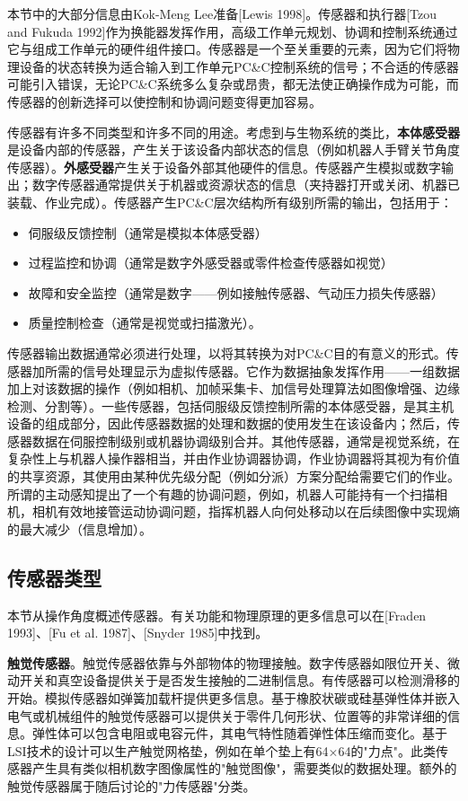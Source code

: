 \documentclass[UTF8,a4paper]{ctexart}
\begin{document}
本节中的大部分信息由Kok-Meng Lee准备[Lewis 1998]。传感器和执行器[Tzou and Fukuda 1992]作为换能器发挥作用，高级工作单元规划、协调和控制系统通过它与组成工作单元的硬件组件接口。传感器是一个至关重要的元素，因为它们将物理设备的状态转换为适合输入到工作单元PC\&C控制系统的信号；不合适的传感器可能引入错误，无论PC\&C系统多么复杂或昂贵，都无法使正确操作成为可能，而传感器的创新选择可以使控制和协调问题变得更加容易。

传感器有许多不同类型和许多不同的用途。考虑到与生物系统的类比，\textbf{本体感受器}是设备内部的传感器，产生关于该设备内部状态的信息（例如机器人手臂关节角度传感器）。\textbf{外感受器}产生关于设备外部其他硬件的信息。传感器产生模拟或数字输出；数字传感器通常提供关于机器或资源状态的信息（夹持器打开或关闭、机器已装载、作业完成）。传感器产生PC\&C层次结构所有级别所需的输出，包括用于：
\begin{itemize}
    \item 伺服级反馈控制（通常是模拟本体感受器）
    \item 过程监控和协调（通常是数字外感受器或零件检查传感器如视觉）
    \item 故障和安全监控（通常是数字——例如接触传感器、气动压力损失传感器）
    \item 质量控制检查（通常是视觉或扫描激光）。
\end{itemize}

传感器输出数据通常必须进行处理，以将其转换为对PC\&C目的有意义的形式。传感器加所需的信号处理显示为虚拟传感器。它作为数据抽象发挥作用——一组数据加上对该数据的操作（例如相机、加帧采集卡、加信号处理算法如图像增强、边缘检测、分割等）。一些传感器，包括伺服级反馈控制所需的本体感受器，是其主机设备的组成部分，因此传感器数据的处理和数据的使用发生在该设备内；然后，传感器数据在伺服控制级别或机器协调级别合并。其他传感器，通常是视觉系统，在复杂性上与机器人操作器相当，并由作业协调器协调，作业协调器将其视为有价值的共享资源，其使用由某种优先级分配（例如分派）方案分配给需要它们的作业。所谓的主动感知提出了一个有趣的协调问题，例如，机器人可能持有一个扫描相机，相机有效地接管运动协调问题，指挥机器人向何处移动以在后续图像中实现熵的最大减少（信息增加）。

\subsection{传感器类型}

本节从操作角度概述传感器。有关功能和物理原理的更多信息可以在[Fraden 1993]、[Fu et al. 1987]、[Snyder 1985]中找到。

\textbf{触觉传感器}。触觉传感器依靠与外部物体的物理接触。数字传感器如限位开关、微动开关和真空设备提供关于是否发生接触的二进制信息。有传感器可以检测滑移的开始。模拟传感器如弹簧加载杆提供更多信息。基于橡胶状碳或硅基弹性体并嵌入电气或机械组件的触觉传感器可以提供关于零件几何形状、位置等的非常详细的信息。弹性体可以包含电阻或电容元件，其电气特性随着弹性体压缩而变化。基于LSI技术的设计可以生产触觉网格垫，例如在单个垫上有64×64的"力点"。此类传感器产生具有类似相机数字图像属性的"触觉图像"，需要类似的数据处理。额外的触觉传感器属于随后讨论的"力传感器"分类。
\end{document}
